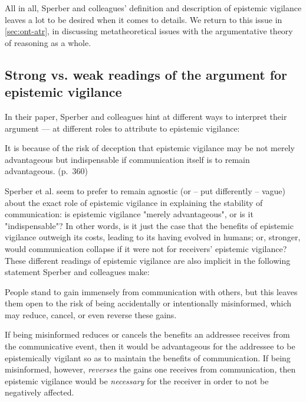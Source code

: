 All in all, Sperber and colleagues' definition and description of epistemic vigilance leaves a lot to be desired when it comes to details. We return to this issue in \cref{sec:ont-atr}, in discussing metatheoretical issues with the argumentative theory of reasoning as a whole.

\subsection{Strong vs. weak readings of the argument for epistemic vigilance}
\label{sec:strong-weak}

In their \citeyear{Sperber10} paper, Sperber and colleagues hint at different ways to interpret their argument --- at different roles to attribute to epistemic vigilance:

\begin{quoting}
    It is because of the risk of deception that epistemic vigilance may be not merely advantageous but indispensable if communication itself is to remain advantageous.
\hfill (p.~360)
\end{quoting}
Sperber et al. seem to prefer to remain agnostic (or -- put differently -- vague) about the exact role of epistemic vigilance in explaining the stability of communication: is epistemic vigilance "merely advantageous", or is it "indispensable"? In other words, is it just the case that the benefits of epistemic vigilance outweigh its costs, leading to its having evolved in humans; or, stronger, would communication collapse if it were not for receivers' epistemic vigilance?
These different readings of epistemic vigilance are also implicit in the following statement Sperber and colleagues make:
\begin{quoting}
    People stand to gain immensely from communication with others, but this leaves them open to the risk of being accidentally or intentionally misinformed, which may reduce, cancel, or even reverse these gains.
    \hfill \citep[p.~360]{Sperber10}
\end{quoting}
If being misinformed reduces or cancels the benefits an addressee receives from the communicative event, then it would be advantageous for the addressee to be epistemically vigilant so as to maintain the benefits of communication. If being misinformed, however, \emph{reverses} the gains one receives from communication, then epistemic vigilance would be \emph{necessary} for the receiver in order to not be negatively affected.

